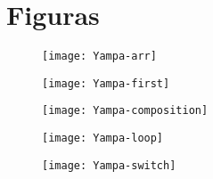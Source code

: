 \section{Figuras}

\begin{figure}[h!]
  \caption{}
  \begin{center}
    \texttt{[image: Yampa-arr]}
  \end{center}
\end{figure}

\begin{figure}[h!]
  \caption{}
  \begin{center}
    \texttt{[image: Yampa-first]}
  \end{center}
\end{figure}

\begin{figure}[h!]
  \caption{}
  \begin{center}
    \texttt{[image: Yampa-composition]}
  \end{center}
\end{figure}

\begin{figure}[h!]
  \caption{}
  \begin{center}
    \texttt{[image: Yampa-loop]}
  \end{center}
\end{figure}

\begin{figure}[h!]
  \caption{}
  \begin{center}
    \texttt{[image: Yampa-switch]}
  \end{center}
\end{figure}
